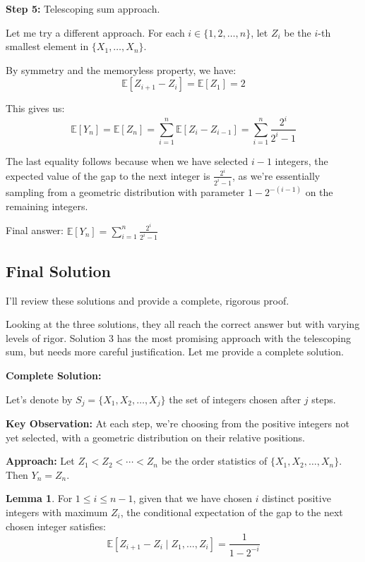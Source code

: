 \documentclass[12pt,a4paper]{article}
\theoremstyle{definition}
\newtheorem{lemma}{Lemma}
\begin{document}
    \textbf{Step 5:} Telescoping sum approach.

    Let me try a different approach. For each $i \in \{1, 2, \ldots, n\}$, let $Z_i$ be the $i$-th smallest element in $\{X_1, \ldots, X_n\}$.

    By symmetry and the memoryless property, we have:
    $$\mathbb{E}[Z_{i+1} - Z_i] = \mathbb{E}[Z_1] = 2$$

    This gives us:
    $$\mathbb{E}[Y_n] = \mathbb{E}[Z_n] = \sum_{i=1}^n \mathbb{E}[Z_i - Z_{i-1}] = \sum_{i=1}^n \frac{2^i}{2^i - 1}$$

    The last equality follows because when we have selected $i-1$ integers, the expected value of the gap to the next integer is $\frac{2^i}{2^i - 1}$, as we're essentially sampling from a geometric distribution with parameter $1 - 2^{-(i-1)}$ on the remaining integers.

    Final answer: $\mathbb{E}[Y_n] = \sum_{i=1}^{n}\frac{2^i}{2^i - 1}$

\subsection{Final Solution}
        I'll review these solutions and provide a complete, rigorous proof.

        Looking at the three solutions, they all reach the correct answer but with varying levels of rigor. Solution 3 has the most promising approach with the telescoping sum, but needs more careful justification. Let me provide a complete solution.

        \textbf{Complete Solution:}

        Let's denote by $S_j = \{X_1, X_2, \ldots, X_j\}$ the set of integers chosen after $j$ steps.

        \textbf{Key Observation:} At each step, we're choosing from the positive integers not yet selected, with a geometric distribution on their relative positions.

        \textbf{Approach:} Let $Z_1 < Z_2 < \cdots < Z_n$ be the order statistics of $\{X_1, X_2, \ldots, X_n\}$. Then $Y_n = Z_n$.

        \begin{lemma}
            For $1 \leq i \leq n-1$, given that we have chosen $i$ distinct positive integers with maximum $Z_i$, the conditional expectation of the gap to the next chosen integer satisfies:
            $$\mathbb{E}[Z_{i+1} - Z_i \mid Z_1, \ldots, Z_i] = \frac{1}{1 - 2^{-i}}$$
        \end{lemma}
\end{document}
